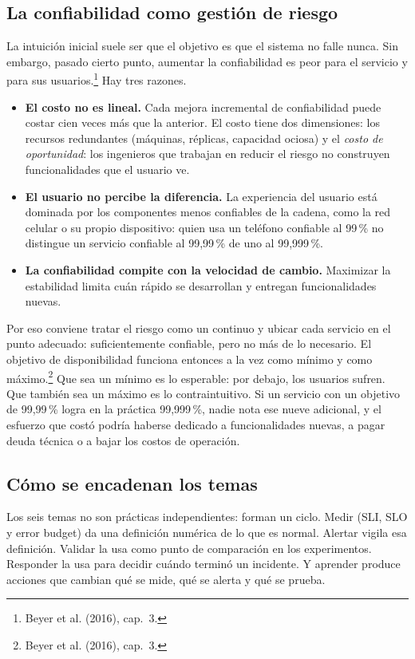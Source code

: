 \documentclass[variant=apuntes,cover=institutional,mode=screen]{ua-engineering-v6-article}
\begin{document}
\subsection{La confiabilidad como gestión de riesgo}

La intuición inicial suele ser que el objetivo es que el sistema no falle nunca. Sin embargo, pasado cierto punto, aumentar la confiabilidad es peor para el servicio y para sus usuarios.\footnote{Beyer et al. (2016), cap.~3.} Hay tres razones.

\begin{itemize}
\item \textbf{El costo no es lineal.} Cada mejora incremental de confiabilidad puede costar cien veces más que la anterior. El costo tiene dos dimensiones: los recursos redundantes (máquinas, réplicas, capacidad ociosa) y el \emph{costo de oportunidad}: los ingenieros que trabajan en reducir el riesgo no construyen funcionalidades que el usuario ve.
\item \textbf{El usuario no percibe la diferencia.} La experiencia del usuario está dominada por los componentes menos confiables de la cadena, como la red celular o su propio dispositivo: quien usa un teléfono confiable al 99\,\% no distingue un servicio confiable al 99,99\,\% de uno al 99,999\,\%.
\item \textbf{La confiabilidad compite con la velocidad de cambio.} Maximizar la estabilidad limita cuán rápido se desarrollan y entregan funcionalidades nuevas.
\end{itemize}

Por eso conviene tratar el riesgo como un continuo y ubicar cada servicio en el punto adecuado: suficientemente confiable, pero no más de lo necesario. El objetivo de disponibilidad funciona entonces a la vez como mínimo y como máximo.\footnote{Beyer et al. (2016), cap.~3.} Que sea un mínimo es lo esperable: por debajo, los usuarios sufren. Que también sea un máximo es lo contraintuitivo. Si un servicio con un objetivo de 99,99\,\% logra en la práctica 99,999\,\%, nadie nota ese nueve adicional, y el esfuerzo que costó podría haberse dedicado a funcionalidades nuevas, a pagar deuda técnica o a bajar los costos de operación.

\subsection{Cómo se encadenan los temas}

Los seis temas no son prácticas independientes: forman un ciclo. Medir (SLI, SLO y error budget) da una definición numérica de lo que es normal. Alertar vigila esa definición. Validar la usa como punto de comparación en los experimentos. Responder la usa para decidir cuándo terminó un incidente. Y aprender produce acciones que cambian qué se mide, qué se alerta y qué se prueba.
\end{document}

